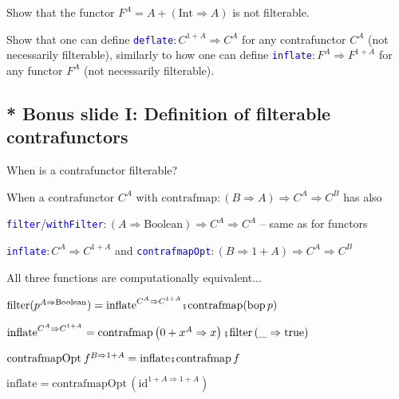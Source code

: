 Show that the functor $F^{A}=A+\left(\text{Int}\Rightarrow A\right)$
is not filterable.

Show that one can define \texttt{\textcolor{blue}{\footnotesize{}deflate}}$:C^{1+A}\Rightarrow C^{A}$
for any contrafunctor $C^{A}$ (not necessarily filterable), similarly
to how one can define \texttt{\textcolor{blue}{\footnotesize{}inflate}}$:F^{A}\Rightarrow F^{1+A}$
for any functor $F^{A}$ (not necessarily filterable). 


\subsection{{*} Bonus slide I: Definition of filterable contrafunctors}

When is a contrafunctor filterable?

When a contrafunctor {\footnotesize{}$C^{A}$} with {\footnotesize{}$\text{contrafmap}:\left(B\Rightarrow A\right)\Rightarrow C^{A}\Rightarrow C^{B}$}
has also

\texttt{\textcolor{blue}{\footnotesize{}filter}}/\texttt{\textcolor{blue}{\footnotesize{}withFilter}}{\footnotesize{}$:\left(A\Rightarrow\text{Boolean}\right)\Rightarrow C^{A}\Rightarrow C^{A}$}
– same as for functors

\texttt{\textcolor{blue}{\footnotesize{}inflate}}{\footnotesize{}$:C^{A}\Rightarrow C^{1+A}$}
and \texttt{\textcolor{blue}{\footnotesize{}contrafmapOpt}}{\footnotesize{}$:\left(B\Rightarrow1+A\right)\Rightarrow C^{A}\Rightarrow C^{B}$}{\footnotesize\par}

All three functions are computationally equivalent...

{\footnotesize{}$\text{filter}(p^{A\Rightarrow\text{Boolean}})=\text{inflate}^{C^{A}\Rightarrow C^{1+A}}\bef\text{contrafmap}(\text{bop}\,p)$}{\footnotesize\par}

{\footnotesize{}$\text{inflate}^{C^{A}\Rightarrow C^{1+A}}=\text{contrafmap}\left(0+x^{A}\Rightarrow x\right)\bef\text{filter}\left(\_\Rightarrow\text{true}\right)$}{\footnotesize\par}

{\footnotesize{}$\text{contrafmapOpt}\:f^{B\Rightarrow1+A}=\text{inflate}\bef\text{contrafmap}\,f$}{\footnotesize\par}

{\footnotesize{}$\text{inflate}=\text{contrafmapOpt}\,(\text{id}^{1+A\Rightarrow1+A})$}{\footnotesize\par}

